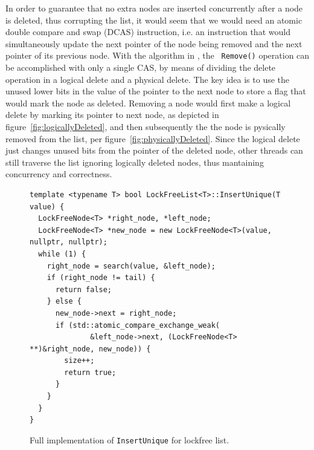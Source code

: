 \documentclass[11pt]{article}
\begin{document}
In order to guarantee that no extra nodes are inserted concurrently after a node is
deleted, thus corrupting the list, it would seem that we would need an atomic
double compare and swap (DCAS) instruction, i.e. an instruction that would
simultaneously update the next pointer of the node being removed and the next
pointer of its previous node. With the algorithm in \cite{Harris}, the {\tt
Remove()} operation can be accomplished with only a single CAS, by means of
dividing the delete operation in a logical delete and a physical delete. The key
idea is to use the unused lower bits in the value of the pointer to the next
node to store a flag that would mark the node as deleted. Removing a node would
first make a logical delete by marking its pointer to next node, as depicted in
figure~\ref{fig:logicallyDeleted}, and then subsequently the the node is
pysically removed from the list, per figure~\ref{fig:physicallyDeleted}. Since
the logical delete just changes unused bits from the pointer of the deleted
node, other threads can still traverse the list ignoring logically deleted
nodes, thus mantaining concurrency and correctness.



\begin{figure}[h]
\begin{center}
\begin{lstlisting}
template <typename T> bool LockFreeList<T>::InsertUnique(T value) {
  LockFreeNode<T> *right_node, *left_node;
  LockFreeNode<T> *new_node = new LockFreeNode<T>(value, nullptr, nullptr);
  while (1) {
    right_node = search(value, &left_node);
    if (right_node != tail) {
      return false;
    } else {
      new_node->next = right_node;
      if (std::atomic_compare_exchange_weak(
              &left_node->next, (LockFreeNode<T> **)&right_node, new_node)) {
        size++;
        return true;
      }
    }
  }
}
\end{lstlisting}
\caption{Full implementation of {\tt InsertUnique} for lockfree list.}
\label{fig:lockfreeIUnique}
\end{center}
\end{figure}
\end{document}
